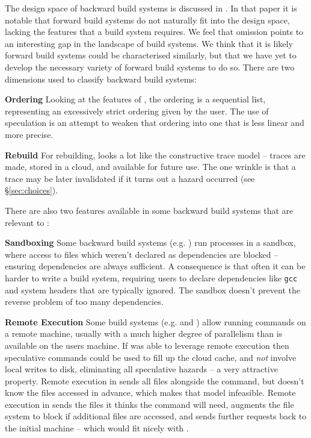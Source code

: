 The design space of backward build systems is discussed in \cite{build_systems_a_la_carte}. In that paper it is notable that forward build systems do not naturally fit into the design space, lacking the features that a build system requires. We feel that omission points to an interesting gap in the landscape of build systems. We think that it is likely forward build systems could be characterised similarly, but that we have yet to develop the necessary variety of forward build systems to do so. There are two dimensions used to classify backward build systems:

\textbf{Ordering} Looking at the features of \Rattle, the ordering is a sequential list, representing an excessively strict ordering given by the user. The use of speculation is an attempt to weaken that ordering into one that is less linear and more precise.

\textbf{Rebuild} For rebuilding, \Rattle looks a lot like the constructive trace model -- traces are made, stored in a cloud, and available for future use. The one wrinkle is that a trace may be later invalidated if it turns out a hazard occurred (see \S\ref{sec:choices}).


There are also two  features available in some backward build systems that are relevant to \Rattle:

\textbf{Sandboxing} Some backward build systems (e.g. \Bazel \cite{bazel}) run processes in a sandbox, where access to files which weren't declared as dependencies are blocked -- ensuring dependencies are always sufficient. A consequence is that often it can be harder to write a \Bazel build system, requiring users to declare dependencies like \texttt{gcc} and system headers that are typically ignored. The sandbox doesn't prevent the reverse problem of too many dependencies.

\textbf{Remote Execution} Some build systems (e.g. \Bazel and \BuildXL \cite{buildxl}) allow running commands on a remote machine, usually with a much higher degree of parallelism than is available on the users machine. If \Rattle was able to leverage remote execution then speculative commands could be used to fill up the cloud cache, and \emph{not} involve local writes to disk, eliminating all speculative hazards -- a very attractive property. Remote execution in \Bazel sends all files alongside the command, but \Rattle doesn't know the files accessed in advance, which makes that model infeasible. Remote execution in \BuildXL sends the files it thinks the command will need, augments the file system to block if additional files are accessed, and sends further requests back to the initial machine -- which would fit nicely with \Rattle.


